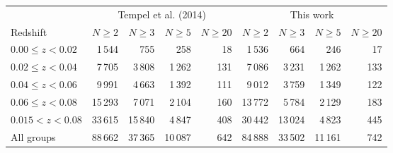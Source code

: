 \begin{tabular}{lrrrrrrrr}
\hline
 & \multicolumn{4}{c}{Tempel et al. (2014)} & \multicolumn{4}{c}{This work} \\
Redshift & $N \geq 2$ & $N \geq 3$ & $N \geq 5$ & $N \geq 20$ & $N \geq 2$ & $N \geq 3$ & $N \geq 5$ & $N \geq 20$ \\
\hline
$0.00 \leq z < 0.02$ & 1\,544 & 755 & 258 & 18 & 1\,536 & 664 & 246 & 17 \\
$0.02 \leq z < 0.04$ & 7\,705 & 3\,808 & 1\,262 & 131 & 7\,086 & 3\,231 & 1\,262 & 133 \\
$0.04 \leq z < 0.06$ & 9\,991 & 4\,663 & 1\,392 & 111 & 9\,012 & 3\,759 & 1\,349 & 122 \\
$0.06 \leq z < 0.08$ & 15\,293 & 7\,071 & 2\,104 & 160 & 13\,772 & 5\,784 & 2\,129 & 183 \\
\hline
$0.015 < z < 0.08$ & 33\,615 & 15\,840 & 4\,847 & 408 & 30\,442 & 13\,024 & 4\,823 & 445 \\
All groups & 88\,662 & 37\,365 & 10\,087 & 642 & 84\,888 & 33\,502 & 11\,161 & 742 \\
\hline
\end{tabular}

